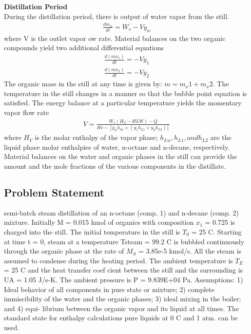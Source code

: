 \documentclass[12pt]{report}
\begin{document}
\textbf{Distillation Period} \\
During the distillation period, there is output of water vapor from the still. 
\begin{gather*}
\frac{dm_w}{dt} = W_s - Vy_w
\end{gather*}
where V is the outlet vapor  ow rate. Material balances on the two organic compounds yield two additional differential equations
\begin{gather*}
\frac{d(mx_1)}{dt} = -Vy_1 \\
\frac{d(mx_2)}{dt} = -Vy_2
\end{gather*}
The organic mass in the still at any time is given by: $m = m_x1 + m_x2$. The temperature in the still changes in a manner so that the bubble point equation is satisfied. The energy balance at a particular temperature yields the momentary vapor flow rate
\begin{gather*}
V = \frac{W_s(H_S-H{LW}) - Q}{Hv-[y_wh_{lw}+(y_1h_{L1}+y_2h_{L2})]}
\end{gather*}
where $H_V$ is the molar enthalpy of the vapor phase; $h_{Lw}, h_{L1}, and h_{L2}$ are the liquid phase molar enthalpies of water, n-octane and n-decane, respectively. Material balances on the water and organic phases in the still can provide the amount and the mole fractions of the various components in the distillate.

\subsection{Problem Statement} 
semi-batch steam distillation of an n-octane (comp. 1) and n-decane
(comp. 2) mixture. Initially M = 0.015 kmol of organics with
composition $x_1$ = 0.725 is charged into the still. The initial
temperature in the still is $T_0$ = 25 \degree C. Starting at time t = 0, steam at a temperature Tsteam = 99.2 \degree C is bubbled continuously through the organic phase at the rate of $M_S$ = 3.85e-5 kmol/s. All the steam is assumed to condense during the heating period. The ambient temperature is $T_E$ = 25 \degree C and the heat transfer coef cient between the still and the surrounding is UA = 1.05 J/s-K. The ambient pressure is P = 9.839E+04 Pa.
Assumptions: 1) Ideal behavior of all components in pure state or mixture; 2) complete immiscibility of the water and the organic phases; 3) ideal mixing in the boiler; and 4) equi- librium between the organic vapor and its liquid at all times. The standard state for enthalpy calculations pure liquids at 0 \degree C and 1 atm. can be used.
\end{document}
